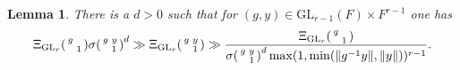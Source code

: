 \documentclass[12pt]{amsart}
\newtheorem{lem}[thm]{Lemma}
\theoremstyle{remark}
\numberwithin{equation}{section}
\newcommand{\GL}{\mathrm{GL}}
\theoremstyle{definition}
\newenvironment{psmatrix}
  {\left(\begin{smallmatrix}}
  {\end{smallmatrix}\right)}
\numberwithin{equation}{subsection}
\newcommand{\norm}[1]{\lVert#1\rVert}
\begin{document}
\begin{lem} \label{lem:parab} There is a $d>0$ such that for $(g,y) \in \GL_{r-1}(F) \times F^{r-1}$ one has 
\begin{align*}
     \Xi_{\GL_{r}}\begin{psmatrix}
         g & \\
         & 1
     \end{psmatrix}\sigma\begin{psmatrix}
         g & y \\
         & 1
     \end{psmatrix}^{d}\gg\Xi_{\GL_r}\begin{psmatrix} g& y \\ & 1 \end{psmatrix} \gg
     \frac{\Xi_{\GL_{r}}\begin{psmatrix} g&  \\ & 1 \end{psmatrix}}{\sigma\begin{psmatrix}
         g & y \\
         & 1
     \end{psmatrix}^{d} \max(1,\min(\norm{g^{-1}y},\norm{y}))^{r-1}}.
\end{align*}
\end{lem}
\end{document}
